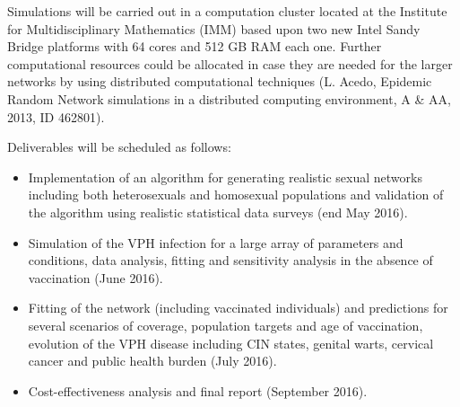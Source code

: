 Simulations will be carried out in a computation cluster located at the Institute for Multidisciplinary Mathematics (IMM) based upon two new Intel Sandy Bridge platforms with 64 cores and 512 GB RAM each one. Further computational resources could be allocated in case they are needed for the larger networks by using distributed computational techniques (L. Acedo, Epidemic Random Network simulations in a distributed computing environment, A \& AA, 2013, ID 462801).

Deliverables will be scheduled as follows:

\begin{itemize}
	\item Implementation of an algorithm for generating realistic sexual networks including both heterosexuals and homosexual populations and validation of the algorithm using realistic statistical data surveys (end May 2016). 
	\item Simulation of the VPH infection for a large array of parameters and conditions, data analysis, fitting and sensitivity analysis in the absence of vaccination (June 2016).
	\item Fitting of the network (including vaccinated individuals) and predictions for several scenarios of coverage, population targets and age of vaccination, evolution of the VPH disease including CIN states, genital warts, cervical cancer and public health burden (July 2016).
	\item Cost-effectiveness analysis and final report (September 2016).
\end{itemize}

 
